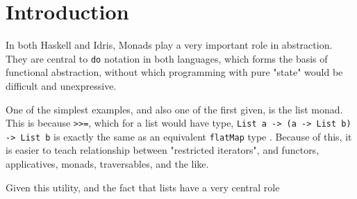 \section{Introduction} 

In both Haskell and Idris, Monads play a very important role in abstraction.
They are central to \verb|do| notation in both languages, which forms the basis of functional abstraction, without which programming with pure "state" would be difficult and unexpressive.

One of the simplest examples, and also one of the first given, is the list monad.
This is because \verb|>>=|, which for a list would have type, \verb|List a -> (a -> List b) -> List b| is exactly the same as an equivalent \verb|flatMap| type \needcite.
Because of this, it is easier to teach relationship between "restricted iterators", and functors, applicatives, monads, traversables, and the like.

Given this utility, and the fact that lists have a very central role
